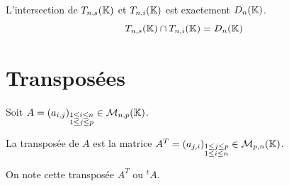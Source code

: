 \documentclass[12pt, a4paper]{report}
\begin{document}
\begin{remark}
    L'intersection de $T_{n,s}(\mathbb{K})$ et $T_{n,i}(\mathbb{K})$ est exactement $D_n(\mathbb{K})$.
    $$T_{n,s}(\mathbb{K}) \cap T_{n,i}(\mathbb{K}) = D_n(\mathbb{K})$$
\end{remark}

\section{Transposées}

\begin{definition}
    Soit $A = (a_{i,j})_{\substack{1 \leq i \leq n\\ 1\leq j \leq p}} \in \mathcal M_{n,p}(\mathbb{K})$.
    
    La transposée de $A$ est la matrice $A^T = (a_{j,i})_{\substack{1 \leq j \leq p\\ 1\leq i \leq n}} \in \mathcal M_{p,n}(\mathbb{K})$.

    On note cette transposée $A^T$ ou $^tA$.
\end{definition}
\end{document}
